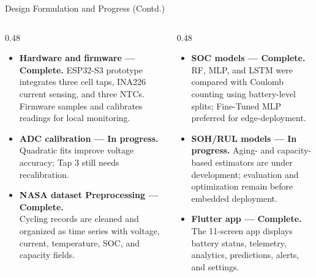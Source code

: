 \documentclass[10pt,aspectratio=43]{beamer}
\begin{document}
\begin{frame}{Design Formulation and Progress (Contd.)}
  \footnotesize
  \begin{columns}[T,onlytextwidth]
    \begin{column}{0.48\textwidth}
      \begin{itemize}
        \setlength{\itemsep}{9pt}
        \item \textbf{Hardware and firmware — Complete.} ESP32-S3 prototype integrates three cell taps, INA226 current sensing, and three NTCs. Firmware samples and calibrates readings for local monitoring.
        \item \textbf{ADC calibration — In progress.} Quadratic fits improve voltage accuracy; Tap 3 still needs recalibration.
        \item \textbf{NASA dataset Preprocessing — Complete.}    \\  Cycling records are cleaned and organized as time series with voltage, current, temperature, SOC, and capacity fields.
      \end{itemize}
    \end{column}
    \hfill
    \begin{column}{0.48\textwidth}
      \begin{itemize}
        \setlength{\itemsep}{9pt}
        \item \textbf{SOC models — Complete.} \\ RF, MLP, and LSTM were compared with Coulomb counting using battery-level splits; Fine-Tuned MLP preferred for edge-deployment.
        \item \textbf{SOH/RUL models — In progress.} Aging- and capacity-based estimators are under development; evaluation and optimization remain before embedded deployment.
        \item \textbf{Flutter app — Complete.} \\ The 11-screen app displays battery status, telemetry, analytics, predictions, alerts, and settings.
      \end{itemize}
    \end{column}
  \end{columns}
\end{frame}
\end{document}

